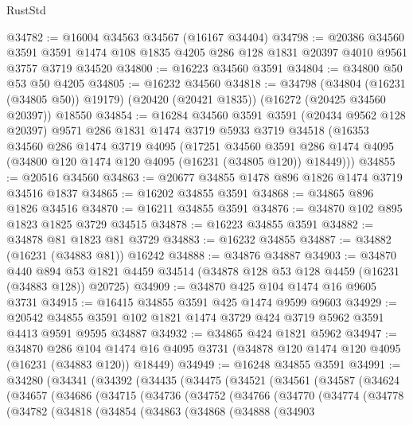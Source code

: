 \begin{lexlean}{RustStd}
\begin{coremodule}
@34782 := @16004 @34563 @34567 (@16167 @34404)
@34798 := @20386
    @34560
    @3591
    @3591
    @1474
    @108
    @1835
    @4205
    @286
    @128
    @1831
    @20397
    @4010
    @9561
    @3757
    @3719
    @34520
@34800 := @16223 @34560 @3591
@34804 := @34800 @50 @53 @50 @4205
@34805 := @16232 @34560
@34818 := @34798
    (@34804 (@16231 (@34805 @50)) @19179)
    (@20420 (@20421 @1835))
    (@16272 (@20425 @34560 @20397))
    @18550
@34854 := @16284
    @34560
    @3591
    @3591
    (@20434 @9562 @128 @20397)
    @9571
    @286
    @1831
    @1474
    @3719
    @5933
    @3719
    @34518
    (@16353
      @34560
      @286
      @1474
      @3719
      @4095
      (@17251
        @34560
        @3591
        @286
        @1474
        @4095
        (@34800 @120 @1474 @120 @4095 (@16231 (@34805 @120)) @18449)))
@34855 := @20516 @34560
@34863 := @20677 @34855 @1478 @896 @1826 @1474 @3719 @34516 @1837
@34865 := @16202 @34855 @3591
@34868 := @34865 @896 @1826 @34516
@34870 := @16211 @34855 @3591
@34876 := @34870 @102 @895 @1823 @1825 @3729 @34515
@34878 := @16223 @34855 @3591
@34882 := @34878 @81 @1823 @81 @3729
@34883 := @16232 @34855
@34887 := @34882 (@16231 (@34883 @81)) @16242
@34888 := @34876 @34887
@34903 := @34870
    @440
    @894
    @53
    @1821
    @4459
    @34514
    (@34878 @128 @53 @128 @4459 (@16231 (@34883 @128)) @20725)
@34909 := @34870 @425 @104 @1474 @16 @9605 @3731
@34915 := @16415 @34855 @3591 @425 @1474 @9599 @9603
@34929 := @20542 @34855 @3591 @102 @1821 @1474 @3729 @424 @3719 @5962 @3591 @4413 @9591 @9595 @34887
@34932 := @34865 @424 @1821 @5962
@34947 := @34870
    @286
    @104
    @1474
    @16
    @4095
    @3731
    (@34878 @120 @1474 @120 @4095 (@16231 (@34883 @120)) @18449)
@34949 := @16248 @34855 @3591
@34991 := @34280
    (@34341
      (@34392
        (@34435
          (@34475
            (@34521
              (@34561
                (@34587
                  (@34624
                    (@34657
                      (@34686
                        (@34715
                          (@34736
                            (@34752
                              (@34766
                                (@34770
                                  (@34774
                                    (@34778
                                      (@34782
                                        (@34818
                                          (@34854
                                            (@34863
                                              (@34868
                                                (@34888
                                                  (@34903

\end{coremodule}
\end{lexlean}
